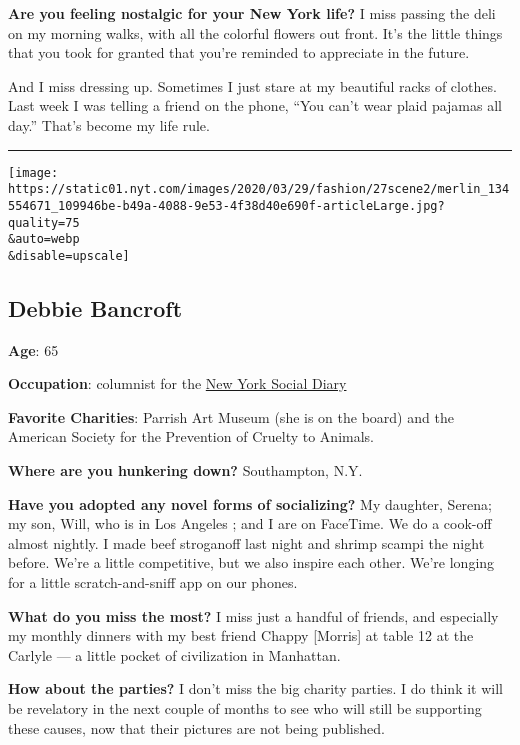 \textbf{Are you feeling nostalgic for your New York life?} I miss
passing the deli on my morning walks, with all the colorful flowers out
front. It's the little things that you took for granted that you're
reminded to appreciate in the future.

And I miss dressing up. Sometimes I just stare at my beautiful racks of
clothes. Last week I was telling a friend on the phone, ``You can't wear
plaid pajamas all day.'' That's become my life rule.

\begin{center}\rule{0.5\linewidth}{\linethickness}\end{center}

\texttt{[image: https://static01.nyt.com/images/2020/03/29/fashion/27scene2/merlin\_134554671\_109946be-b49a-4088-9e53-4f38d40e690f-articleLarge.jpg?quality=75\\\&auto=webp\\\&disable=upscale]}

\hypertarget{debbie-bancroft}{%
\subsection{Debbie Bancroft}\label{debbie-bancroft}}

\textbf{Age}: 65

\textbf{Occupation}: columnist for the
\href{https://www.newyorksocialdiary.com/}{New York Social Diary}

\textbf{Favorite Charities}: Parrish Art Museum (she is on the board)
and the American Society for the Prevention of Cruelty to Animals.

\textbf{Where are you hunkering down?} Southampton, N.Y.

\textbf{Have you adopted any novel forms of socializing?} My daughter,
Serena; my son, Will, who is in Los Angeles ; and I are on FaceTime. We
do a cook-off almost nightly. I made beef stroganoff last night and
shrimp scampi the night before. We're a little competitive, but we also
inspire each other. We're longing for a little scratch-and-sniff app on
our phones.

\textbf{What do you miss the most?} I miss just a handful of friends,
and especially my monthly dinners with my best friend Chappy
{[}Morris{]} at table 12 at the Carlyle --- a little pocket of
civilization in Manhattan.

\textbf{How about the parties?} I don't miss the big charity parties. I
do think it will be revelatory in the next couple of months to see who
will still be supporting these causes, now that their pictures are not
being published.

